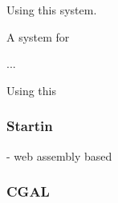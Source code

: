 

Using this system. 



A system for 

...

Using this 


\subsubsection{ Startin }
- web assembly based

\subsubsection{ CGAL }





